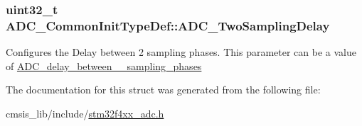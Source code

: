 \subsubsection[{\texorpdfstring{A\+D\+C\+\_\+\+Two\+Sampling\+Delay}{ADC_TwoSamplingDelay}}]{\setlength{\rightskip}{0pt plus 5cm}uint32\+\_\+t A\+D\+C\+\_\+\+Common\+Init\+Type\+Def\+::\+A\+D\+C\+\_\+\+Two\+Sampling\+Delay}\hypertarget{struct_a_d_c___common_init_type_def_a2828abd59ed1777ae66c642d89be410e}{}\label{struct_a_d_c___common_init_type_def_a2828abd59ed1777ae66c642d89be410e}
Configures the Delay between 2 sampling phases. This parameter can be a value of \hyperlink{group___a_d_c__delay__between__2__sampling__phases}{A\+D\+C\+\_\+delay\+\_\+between\+\_\+\_\+sampling\+\_\+phases} 

The documentation for this struct was generated from the following file\+:\begin{DoxyCompactItemize}
\item 
cmsis\+\_\+lib/include/\hyperlink{stm32f4xx__adc_8h}{stm32f4xx\+\_\+adc.\+h}\end{DoxyCompactItemize}
